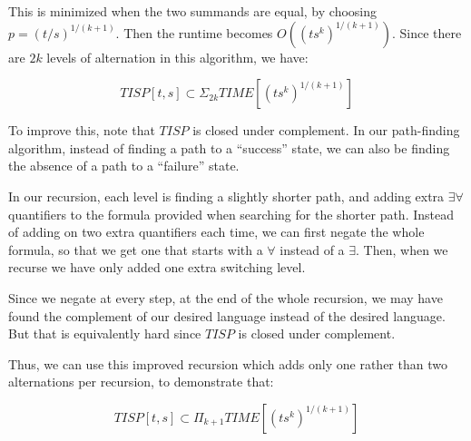 \documentclass{article}
\newenvironment{problem}[2][Problem]{\begin{trivlist}
\item[\hskip \labelsep {\bfseries #1}\hskip \labelsep {\bfseries #2.}]}{\end{trivlist}}
\begin{document}
\begin{problem}{3}
  This is minimized when the two summands are equal, by choosing
  $p = (t/s)^{1/(k+1)}$. Then the runtime becomes
  $O((ts^k)^{1/(k+1)})$. Since there are $2k$ levels of alternation in
  this algorithm, we have:

  \begin{equation}
    TISP[t, s] \subset \Sigma_{2k}TIME[(ts^k)^{1/(k+1)}]
  \end{equation}

  To improve this, note that $TISP$ is closed under
  complement. In our path-finding algorithm, instead of finding a path
  to a ``success'' state, we can also be finding the absence of a path
  to a ``failure'' state.

  In our recursion, each level is finding a slightly shorter path, and
  adding extra $\exists \forall$ quantifiers to the formula provided
  when searching for the shorter path. Instead of adding on two extra
  quantifiers each time, we can first negate the whole formula, so
  that we get one that starts with a $\forall$ instead of a
  $\exists$. Then, when we recurse we have only added one extra
  switching level.

  Since we negate at every step, at the end of the whole recursion, we
  may have found the complement of our desired language instead of the
  desired language. But that is equivalently hard since $TISP$ is
  closed under complement.

  Thus, we can use this improved recursion which adds only one rather
  than two alternations per recursion, to demonstrate that:

  \begin{equation}
    TISP[t, s] \subset \Pi_{k+1}TIME[(ts^k)^{1/(k+1)}]
  \end{equation}
  
\end{problem}
\end{document}
